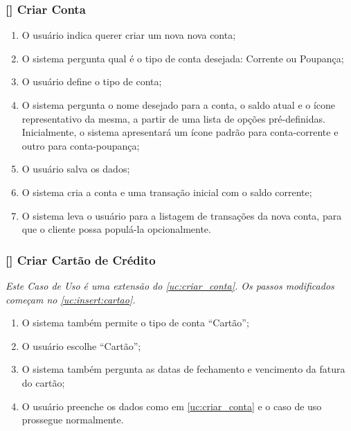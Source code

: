 \documentclass[a4paper]{abnt}
\begin{document}
\subsubsection{[\UC\label{uc:criar_conta}] Criar Conta}
\begin{enumerate}[itemsep=-1ex]
	\item O usuário indica querer criar um nova nova conta;
	\item O sistema pergunta qual é o tipo de conta desejada: Corrente ou Poupança; \label{uc:insert:cartao}
	\item O usuário define o tipo de conta;
	\item O sistema pergunta o nome desejado para a conta, o saldo atual e o ícone representativo da mesma, a partir de uma lista de opções pré-definidas. Inicialmente, o sistema apresentará um ícone padrão para conta-corrente e outro para conta-poupança;
	\item O usuário salva os dados;
	\item O sistema cria a conta e uma transação inicial com o saldo corrente;
	\item O sistema leva o usuário para a listagem de transações da nova conta, para que o cliente possa populá-la opcionalmente.
\end{enumerate}

\subsubsection{[\UC] Criar Cart\~ao de Crédito}
\emph{Este Caso de Uso é uma extensão do \ref{uc:criar_conta}. Os passos modificados começam no \ref{uc:insert:cartao}.}
\begin{enumerate}[itemsep=-1ex,topsep=-1ex]
	\item O sistema também permite o tipo de conta ``Cart\~ao'';
	\item O usuário escolhe ``Cart\~ao'';
	\item O sistema também pergunta as datas de fechamento e vencimento da fatura do cart\~ao;
	\item O usuário preenche os dados como em \ref{uc:criar_conta} e o caso de uso prossegue normalmente.
\end{enumerate}
\end{document}
